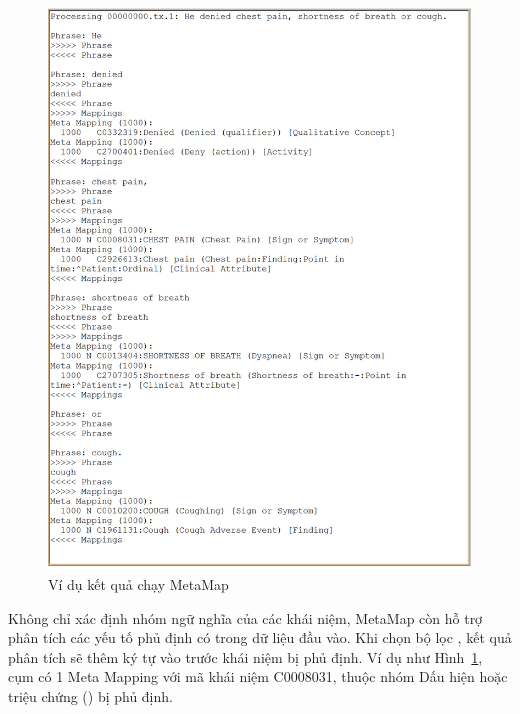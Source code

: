 \begin{figure}[H]
\centering
\includegraphics[scale=0.35]{../hinh/metamapsample.png}
\caption{Ví dụ kết quả chạy MetaMap}
\label{fig:metamapsample}
\end{figure}

Không chỉ xác định nhóm ngữ nghĩa của các khái niệm, MetaMap còn hỗ trợ phân tích các yếu tố phủ định có trong dữ liệu đầu vào. Khi chọn bộ lọc , kết quả phân tích sẽ thêm ký tự  vào trước khái niệm bị phủ định. Ví dụ như Hình~\ref{fig:metamapsample}, cụm  có 1 Meta Mapping với mã khái niệm C0008031, thuộc nhóm Dấu hiện hoặc triệu chứng () bị phủ định.
